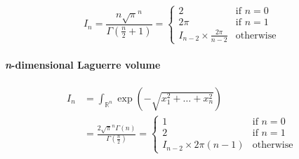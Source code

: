 \documentclass{scrartcl}
\begin{document}
\begin{equation}\label{ndimsphere}
I_n
= \frac{n \sqrt{\pi}^n}{\Gamma(\frac{n}{2}+1)}
= \begin{cases}
  2&\text{if $n = 0$}\\
  2\pi&\text{if $n = 1$}\\
  I_{n-2} \times \frac{2\pi}{n - 2}&\text{otherwise}
\end{cases}
\end{equation}


\paragraph{\textit{n}-dimensional Laguerre volume}

\begin{equation}\label{ndimlaguerre}
  \begin{split}
  I_n
  &= \int_{\mathbb{R}^n} \exp\left(-\sqrt{x_1^2+\dots+x_n^2}\right)\\
  &= \frac{2 \sqrt{\pi}^n \Gamma(n)}{\Gamma(\frac{n}{2})}
  = \begin{cases}
    1&\text{if $n=0$}\\
    2&\text{if $n=1$}\\
    I_{n-2} \times 2\pi(n-1)&\text{otherwise}
  \end{cases}
  \end{split}
\end{equation}
\end{document}
